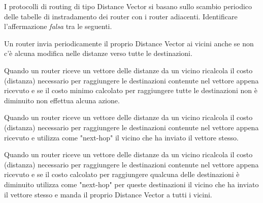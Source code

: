 \question
I protocolli di routing di tipo Distance Vector si basano sullo scambio periodico delle tabelle di instradamento dei router con i router adiacenti.
Identificare l'affermazione \emph{falsa} tra le seguenti.

\begin{checkboxes}
	\choice Un router invia periodicamente il proprio Distance Vector ai vicini anche se non c'è alcuna modifica nelle distanze verso tutte le destinazioni.

	\choice Quando un router riceve un vettore delle distanze da un vicino ricalcola il costo (distanza) necessario per raggiungere le destinazioni contenute nel vettore appena ricevuto e se il costo minimo calcolato per raggiungere tutte le destinazioni non è diminuito non effettua alcuna azione.

	\CorrectChoice Quando un router riceve un vettore delle distanze da un vicino ricalcola il costo (distanza) necessario per raggiungere le destinazioni contenute nel vettore appena ricevuto e utilizza come "next-hop" il vicino che ha inviato il vettore stesso.

	\choice Quando un router riceve un vettore delle distanze da un vicino ricalcola il costo (distanza) necessario per raggiungere le destinazioni contenute nel vettore appena ricevuto e se il costo calcolato per raggiungere qualcuna delle destinazioni è diminuito utilizza come "next-hop" per queste destinazioni il vicino che ha inviato il vettore stesso e manda il proprio Distance Vector a tutti i vicini.
\end{checkboxes}
